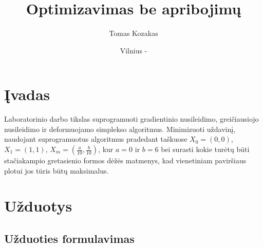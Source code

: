 \documentclass{VUMIFPSkursinis}
\title{Optimizavimas be apribojimų}
\author{Tomas Kozakas}
\date{Vilnius - \the\year}
\begin{document}
\maketitle

\tableofcontents

\section{Įvadas}

Laboratorinio darbo tikslas suprogramuoti gradientinio nusileidimo,
greičiausiojo nusileidimo ir deformuojamo simplekso algoritmus.
Minimizuoti uždavinį, naudojant suprogramuotus algoritmus
pradedant taškuose $X_0 = (0,0)$, $X_1 = (1, 1)$, $X_m = (\frac{a}{10}, \frac{b}{10})$, kur $a = 0$ ir $b = 6$ bei surasti kokie turėtų būti stačiakampio gretasienio formos dėžės matmenys, kad vienetiniam
paviršiaus plotui jos tūris būtų maksimalus.

\section{Užduotys}
\subsection{Užduoties formulavimas}
\end{document}
